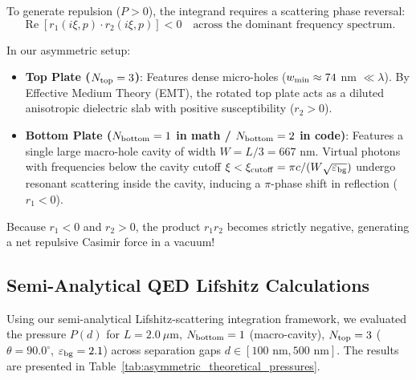 \documentclass[12pt,letterpaper]{article}
\begin{document}
To generate repulsion ($P > 0$), the integrand requires a scattering phase reversal:
\begin{equation}
\operatorname{Re} \left[ r_1(i\xi, p) \cdot r_2(i\xi, p) \right] < 0 \quad \text{across the dominant frequency spectrum.}
\end{equation}

In our asymmetric setup:
\begin{itemize}
    \item \textbf{Top Plate ($N_{\rm top} = 3$)}: Features dense micro-holes ($w_{\rm min} \approx 74$ nm $\ll \lambda$). By Effective Medium Theory (EMT), the rotated top plate acts as a diluted anisotropic dielectric slab with positive susceptibility ($r_2 > 0$).
    \item \textbf{Bottom Plate ($N_{\rm bottom} = 1$ in math / $N_{\rm bottom} = 2$ in code)}: Features a single large macro-hole cavity of width $W = L/3 = 667$ nm. Virtual photons with frequencies below the cavity cutoff $\xi < \xi_{\rm cutoff} = \pi c / (W \sqrt{\varepsilon_{\rm bg}})$ undergo resonant scattering inside the cavity, inducing a $\pi$-phase shift in reflection ($r_1 < 0$).
\end{itemize}

Because $r_1 < 0$ and $r_2 > 0$, the product $r_1 r_2$ becomes strictly negative, generating a net repulsive Casimir force in a vacuum!

\subsection{Semi-Analytical QED Lifshitz Calculations}
Using our semi-analytical Lifshitz-scattering integration framework, we evaluated the pressure $P(d)$ for $L = 2.0\ \mu\text{m}$, $N_{\rm bottom} = 1$ (macro-cavity), $N_{\rm top} = 3$ ($\theta = 90.0^\circ$, $\varepsilon_{\rm bg} = 2.1$) across separation gaps $d \in [100\text{ nm}, 500\text{ nm}]$. The results are presented in Table~\ref{tab:asymmetric_theoretical_pressures}.
\end{document}
